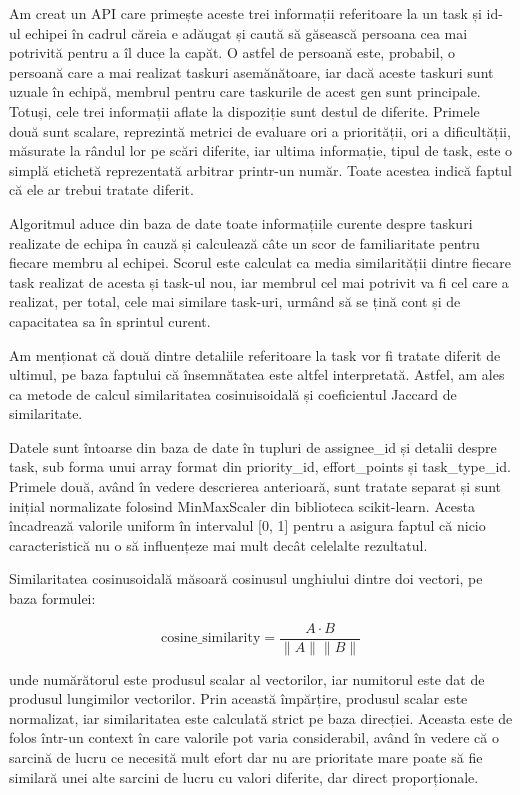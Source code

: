 Am creat un API care primește aceste trei informații referitoare la un task și id-ul echipei în cadrul căreia e adăugat și caută să găsească persoana cea mai potrivită pentru a îl duce la capăt. O astfel de persoană este, probabil, o persoană care a mai realizat taskuri asemănătoare, iar dacă aceste taskuri sunt uzuale în echipă, membrul pentru care taskurile de acest gen sunt principale. Totuși, cele trei informații aflate la dispoziție sunt destul de diferite. Primele două sunt scalare, reprezintă metrici de evaluare ori a priorității, ori a dificultății, măsurate la rândul lor pe scări diferite, iar ultima informație, tipul de task, este o simplă etichetă reprezentată arbitrar printr-un număr. Toate acestea indică faptul că ele ar trebui tratate diferit.

Algoritmul aduce din baza de date toate informațiile curente despre taskuri realizate de echipa în cauză și calculează câte un scor de familiaritate pentru fiecare membru al echipei. Scorul este calculat ca media similarității dintre fiecare task realizat de acesta și task-ul nou, iar membrul cel mai potrivit va fi cel care a realizat, per total, cele mai similare task-uri, urmând să se țină cont și de capacitatea sa în sprintul curent.

Am menționat că două dintre detaliile referitoare la task vor fi tratate diferit de ultimul, pe baza faptului că însemnătatea este altfel interpretată. Astfel, am ales ca metode de calcul similaritatea cosinuisoidală și coeficientul Jaccard de similaritate.

Datele sunt întoarse din baza de date în tupluri de assignee_id și detalii despre task, sub forma unui array format din priority_id, effort_points și task_type_id. Primele două, având în vedere descrierea anterioară, sunt tratate separat și sunt inițial normalizate folosind MinMaxScaler din biblioteca scikit-learn. Acesta încadrează valorile uniform în intervalul [0, 1] pentru a asigura faptul că nicio caracteristică nu o să influențeze mai mult decât celelalte rezultatul.

Similaritatea cosinusoidală măsoară cosinusul unghiului dintre doi vectori, pe baza formulei: 

\[
\text{cosine_similarity} = \frac{A \cdot B}{\|A\| \|B\|}
\]

unde numărătorul este produsul scalar al vectorilor, iar numitorul este dat de produsul lungimilor vectorilor. Prin această împărțire, produsul scalar este normalizat, iar similaritatea este calculată strict pe baza direcției. Aceasta este de folos într-un context în care valorile pot varia considerabil, având în vedere că o sarcină de lucru ce necesită mult efort dar nu are prioritate mare poate să fie similară unei alte sarcini de lucru cu valori diferite, dar direct proporționale.

